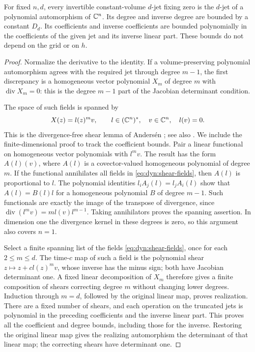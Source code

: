 \begin{lemma}\label{lem:volume-jets}
For fixed $n,d$, every invertible constant-volume $d$-jet fixing zero
is the $d$-jet of a polynomial automorphism of $\mathbb C^n$.  Its degree and
inverse degree are bounded by a constant $D_d$.  Its coefficients and
inverse coefficients are bounded polynomially in the coefficients of
the given jet and its inverse linear part.  These bounds do not depend
on the grid or on $h$.
\end{lemma}

\begin{proof}
Normalize the derivative to the identity.  If a volume-preserving
polynomial automorphism agrees with the required jet through degree
$m-1$, the first discrepancy is a homogeneous vector polynomial $X_m$
of degree $m$ with $\operatorname{div}X_m=0$: this is the degree $m-1$
part of the Jacobian determinant condition.

The space of such fields is spanned by
\begin{equation}
 X(z)=l(z)^m v,\qquad l\in(\mathbb C^n)^*,\quad v\in\mathbb C^n,\quad l(v)=0.
 \label{eq:dyn:shear-fields}
\end{equation}
This is the divergence-free shear lemma of Anders\'en
\cite{AndersenVolume1990}; see also
\cite[proof of Theorem~3.1]{ForstnericLarusson}.
We include the finite-dimensional proof to track the coefficient bounds.
Pair a linear functional on
homogeneous vector polynomials with $l^m v$.  The result has the form
$A(l)(v)$, where $A(l)$ is a covector-valued homogeneous polynomial of
degree $m$.  If the functional annihilates all fields in
\eqref{eq:dyn:shear-fields}, then $A(l)$ is proportional to $l$.
The polynomial identities $l_iA_j(l)=l_jA_i(l)$ show that
$A(l)=B(l)l$ for a homogeneous polynomial $B$ of degree $m-1$.
Such functionals are exactly the image of the transpose of divergence,
since $\operatorname{div}(l^m v)=m l(v)l^{m-1}$.  Taking annihilators
proves the spanning assertion.  In dimension one the divergence kernel
in these degrees is zero, so this argument also covers $n=1$.

Select a finite spanning list of the fields
\eqref{eq:dyn:shear-fields}, once for each $2\le m\le d$.
The time-$c$ map of such a field is the polynomial shear
$z\mapsto z+c l(z)^m v$, whose inverse has the minus sign; both have
Jacobian determinant one.  A fixed linear decomposition of $X_m$
therefore gives a finite composition of shears correcting degree $m$
without changing lower degrees.  Induction through $m=d$, followed by
the original linear map, proves realization.  There are a fixed number
of shears, and each operation on the truncated jets is polynomial in
the preceding coefficients and the inverse linear part.  This proves
all the coefficient and degree bounds, including those for the inverse.
Restoring the original linear map gives the realizing automorphism
the determinant of that linear map; the correcting shears have
determinant one.
\end{proof}


